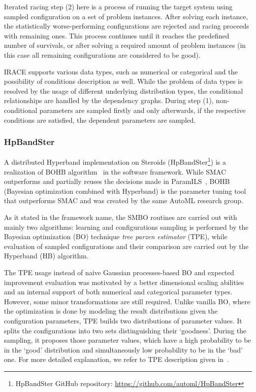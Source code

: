 Iterated racing step (2) here is a process of running the target system using sampled configuration on a set of problem instances. After solving each instance, the statistically worse-performing configurations are rejected and racing proceeds with remaining ones. This process continues until it reaches the predefined number of survivals, or after solving a required amount of problem instances (in this case all remaining configurations are considered to be good). 

IRACE supports various data types, such as numerical or categorical and the possibility of conditions description as well. While the problem of data types is resolved by the usage of different underlying distribution types, the conditional relationships are handled by the dependency graphs. During step (1), non-conditional parameters are sampled firstly and only afterwards, if the respective conditions are satisfied, the dependent parameters are sampled.


\subsubsection{HpBandSter}\label{bg: bohb}
A distributed Hyperband implementation on Steroids (HpBandSter\footnote{HpBandSter GitHub repository: \url{https://github.com/automl/HpBandSter}}) is a realization of BOHB algorithm~\cite{falkner2018bohb} in the software framework.
While SMAC outperforms and partially reuses the decisions made in ParamILS~\cite{hutter2009paramils}, BOHB (Bayesian optimization combined with Hyperband) is the parameter tuning tool that outperforms SMAC and was created by the same AutoML research group.

As it stated in the framework name, the SMBO routines are carried out with mainly two algorithms: learning and configurations sampling is performed by the Bayesian optimization (BO) technique \emph{tree parzen estimator} (TPE), while evaluation of sampled configurations and their comparison are carried out by the Hyperband (HB) algorithm.

The TPE usage instead of naive Gaussian processes-based BO and expected improvement evaluation was motivated by a better dimensional scaling abilities and an internal support of both numerical and categorical parameter types. However, some minor transformations are still required.
Unlike vanilla BO, where the optimization is done by modeling the result distributions given the configuration parameters, TPE builds two distributions of parameter values. It splits the configurations into two sets distinguishing their `goodness'. During the sampling, it proposes those parameter values, which have a high probability to be in the `good' distribution and simultaneously low probability to be in the `bad' one. For more detailed explanation, we refer to TPE description given in~\cite{bergstra2011algorithms}.

